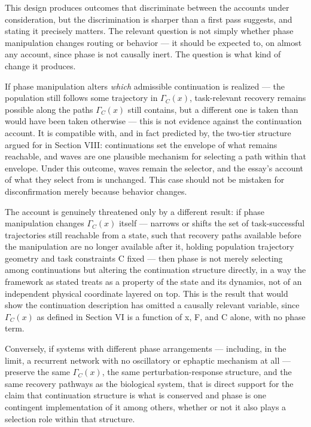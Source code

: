 \documentclass[11pt]{article}
\begin{document}
This design produces outcomes that discriminate between the accounts under consideration, but the discrimination is sharper than a first pass suggests, and stating it precisely matters. The relevant question is not simply whether phase manipulation changes routing or behavior — it should be expected to, on almost any account, since phase is not causally inert. The question is what kind of change it produces.

If phase manipulation alters \textit{which} admissible continuation is realized — the population still follows some trajectory in $\Gamma_C(x)$, task-relevant recovery remains possible along the paths $\Gamma_C(x)$ still contains, but a different one is taken than would have been taken otherwise — this is not evidence against the continuation account. It is compatible with, and in fact predicted by, the two-tier structure argued for in Section VIII: continuations set the envelope of what remains reachable, and waves are one plausible mechanism for selecting a path within that envelope. Under this outcome, waves remain the selector, and the essay's account of what they select from is unchanged. This case should not be mistaken for disconfirmation merely because behavior changes.

The account is genuinely threatened only by a different result: if phase manipulation changes $\Gamma_C(x)$ itself — narrows or shifts the set of task-successful trajectories still reachable from a state, such that recovery paths available before the manipulation are no longer available after it, holding population trajectory geometry and task constraints C fixed — then phase is not merely selecting among continuations but altering the continuation structure directly, in a way the framework as stated treats as a property of the state and its dynamics, not of an independent physical coordinate layered on top. This is the result that would show the continuation description has omitted a causally relevant variable, since $\Gamma_C(x)$ as defined in Section VI is a function of x, F, and C alone, with no phase term.

Conversely, if systems with different phase arrangements — including, in the limit, a recurrent network with no oscillatory or ephaptic mechanism at all — preserve the same $\Gamma_C(x)$, the same perturbation-response structure, and the same recovery pathways as the biological system, that is direct support for the claim that continuation structure is what is conserved and phase is one contingent implementation of it among others, whether or not it also plays a selection role within that structure.
\end{document}
